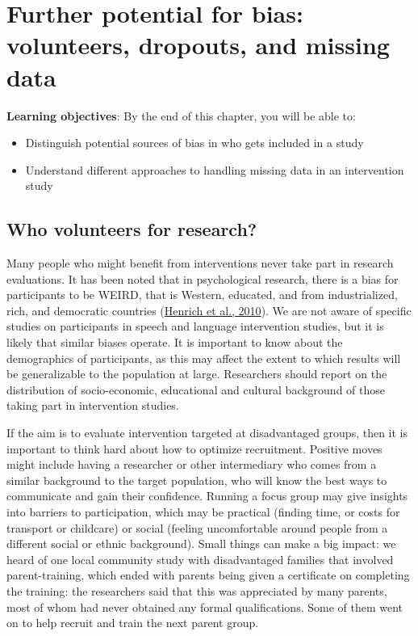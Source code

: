 \documentclass{krantz}
\begin{document}
\hypertarget{dropouts}{%
\chapter{Further potential for bias: volunteers, dropouts, and missing data}\label{dropouts}}

\textbf{Learning objectives}: By the end of this chapter, you will be able to:

\begin{itemize}
\item
  Distinguish potential sources of bias in who gets included in a study
\item
  Understand different approaches to handling missing data in an intervention study
\end{itemize}

\hypertarget{who-volunteers-for-research}{%
\section{Who volunteers for research?}\label{who-volunteers-for-research}}

Many people who might benefit from interventions never take part in research evaluations. It has been noted that in psychological research, there is a bias for participants to be WEIRD, that is Western, educated, and from industrialized, rich, and democratic countries (\protect\hyperlink{ref-henrich2010}{Henrich et al., 2010}). We are not aware of specific studies on participants in speech and language intervention studies, but it is likely that similar biases operate. It is important to know about the demographics of participants, as this may affect the extent to which results will be generalizable to the population at large. Researchers should report on the distribution of socio-economic, educational and cultural background of those taking part in intervention studies.

If the aim is to evaluate intervention targeted at disadvantaged groups, then it is important to think hard about how to optimize recruitment. Positive moves might include having a researcher or other intermediary who comes from a similar background to the target population, who will know the best ways to communicate and gain their confidence. Running a focus group may give insights into barriers to participation, which may be practical (finding time, or costs for transport or childcare) or social (feeling uncomfortable around people from a different social or ethnic background). Small things can make a big impact: we heard of one local community study with disadvantaged families that involved parent-training, which ended with parents being given a certificate on completing the training: the researchers said that this was appreciated by many parents, most of whom had never obtained any formal qualifications. Some of them went on to help recruit and train the next parent group.
\end{document}
